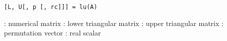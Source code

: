 
\begin{mandesc}
\end{mandesc}

\begin{calling_sequence}
\begin{verbatim}
[L, U[, p [, rc]]] = lu(A)
\end{verbatim}
\end{calling_sequence}
\begin{parameters}
  \begin{varlist}
     :  numerical matrix
     : lower triangular matrix 
     : upper triangular matrix
     : permutation vector
     : real scalar
  \end{varlist}
\end{parameters}


